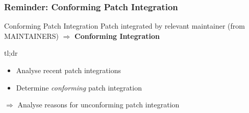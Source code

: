 \documentclass[9pt]{beamer}
\begin{document}
	\begin{frame}
	\frametitle{Reminder: Conforming Patch Integration} %
		\begin{alertblock}{Conforming Patch Integration}
			Patch integrated by relevant maintainer (from MAINTAINERS) $\Rightarrow$ \textbf{Conforming Integration}
		\end{alertblock}

		\begin{block}{tl;dr}
			\begin{itemize}
				\item Analyse recent patch integrations
				\item Determine \textit{conforming} patch integration
			\end{itemize}
		\end{block}
		$\Rightarrow$ Analyse reasons for unconforming patch integration
	\end{frame}
\end{document}
